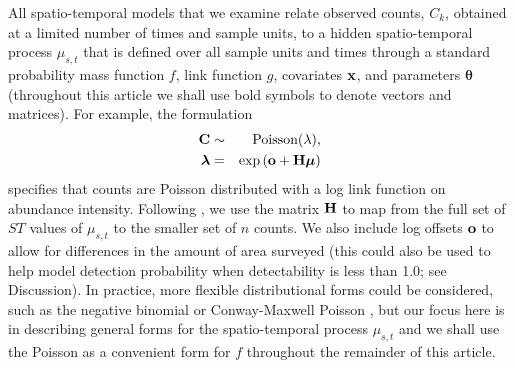 \documentclass[times,mee,doublespace,]{besauth2}
\begin{document}
All spatio-temporal models that we examine relate observed counts, $C_k$, obtained at a limited number of times and sample units, to a hidden spatio-temporal process $\mu_{s,t}$ that is defined over all sample units and times through a standard probability mass function $f$, link function $g$, covariates ${\bf x}$, and parameters $\boldsymbol{\theta}$ (throughout this article we shall use bold symbols to denote vectors and matrices).  For example, the formulation
\begin{eqnarray}
  {\bf C} & \sim & \textrm{Poisson}({\bf \lambda}), \nonumber \\
  \boldsymbol{\lambda} & = & \exp \left( {\bf o} + {\bf H}\boldsymbol{\mu} \right) \label{eq:basic-mod}
\end{eqnarray}
specifies that counts are Poisson distributed with a log link function on abundance intensity. Following \citet{WikleHooten2010}, we use the matrix ${\bf H}$ to map from the full set of $ST$ values of $\mu_{s,t}$ to the smaller set of $n$ counts. We also include log offsets ${\bf o}$ to allow for differences in the amount of area surveyed (this could also be used to help model detection probability when detectability is less than 1.0; see Discussion).  In practice, more flexible distributional forms could be considered, such as the negative binomial or Conway-Maxwell Poisson \citep{WuEtAl2013}, but our focus here is in describing general forms for the spatio-temporal process $\mu_{s,t}$ and we shall use the Poisson as a convenient form for $f$ throughout the remainder of this article.
\end{document}
